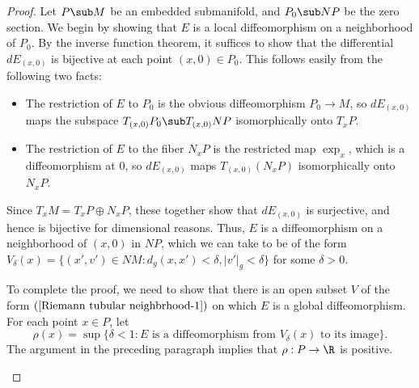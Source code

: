 \begin{proof}
Let $P\sub M$ be an embedded submanifold, and $P_0\sub NP$ be the zero section. We begin by showing that $E$ is a local diffeomorphism on a neighborhood of $P_0$. By 
the inverse function theorem, it suffices to show that the differential $dE_{(x,0)}$ is bijective at each point $(x,0)\in P_0$. This follows easily from the following 
two facts: 
\begin{itemize}
\item The restriction of $E$ to $P_0$ is the obvious diffeomorphism $P_0\to M$, so $dE_{(x,0)}$ maps the subspace $T_{(x,0)}P_0\sub T_{(x,0)}NP$ isomorphically onto 
$T_xP$.
\item The restriction of $E$ to the fiber $N_xP$ is the restricted map $\exp_x$, which is a diffeomorphism at $0$, so $dE_{(x,0)}$ maps $T_{(x,0)}(N_xP)$ isomorphically 
onto $N_xP$.
\end{itemize}  
Since $T_xM=T_xP\oplus N_xP$, these together show that $dE_{(x,0)}$ is surjective, and hence is bijective for dimensional reasons. Thus, $E$ is a diffeomorphism on a 
neighborhood of $(x,0)$ in $NP$, which we can take to be of the form $V_\delta(x)=\{(x',v')\in NM:d_g(x,x')<\delta,|v'|_g<\delta\}$ for some $\delta>0$.\par
To complete the proof, we need to show that there is an open subset $V$ of the form $(\ref{Riemann tubular neighbrhood-1})$ on which $E$ is a global diffeomorphism. 
For each point $x\in P$, let 
\[\rho(x)=\sup\{\delta<1:E\text{ is a diffeomorphism from $V_\delta(x)$ to its image}\}.\]
The argument in the preceding paragraph implies that $\rho:P\to\R$ is positive.
\begin{figure}[htbp]
\centering

\end{figure}
\end{proof}
